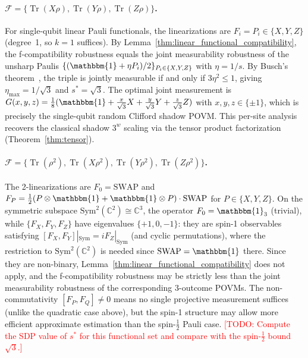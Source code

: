 \documentclass[aps,%
twocolumn,%
floatfix,%
pra,%
amsfonts,%
groupedaddress,%
superscriptaddress]{revtex4-2}%
\DeclareMathOperator{\tr}{Tr}
\newcommand{\ox}{\otimes}
\newcommand{\1}{\mathbbm{1}}
\begin{document}
\paragraph{$\mathcal{F} = \{\tr(X\rho), \tr(Y\rho), \tr(Z\rho)\}$.}
\color{red}
For single-qubit linear Pauli functionals, the linearizations are $F_i = P_i \in \{X,Y,Z\}$ (degree~1, so $k=1$ suffices). By Lemma~\ref{thm:linear_functional_compatibility}, the f-compatibility robustness equals the joint measurability robustness of the unsharp Paulis $\{(\1 + \eta P_i)/2\}_{P_i \in \{X,Y,Z\}}$ with $\eta = 1/s$. By Busch's theorem~\cite{Busch1986}, the triple is jointly measurable if and only if $3\eta^2 \leq 1$, giving $\eta_{\max} = 1/\sqrt{3}$ and $s^* = \sqrt{3}$. The optimal joint measurement is $G(x,y,z) = \frac{1}{8}(\1 + \frac{x}{\sqrt{3}} X + \frac{y}{\sqrt{3}} Y + \frac{z}{\sqrt{3}} Z)$ with $x,y,z \in \{\pm 1\}$, which is precisely the single-qubit random Clifford shadow POVM. This per-site analysis recovers the classical shadow $3^w$ scaling via the tensor product factorization (Theorem~\ref{thm:tensor}).
\color{black}

\paragraph{$\mathcal{F} = \{ \tr(\rho^2),\tr(X\rho^2), \tr(Y\rho^2), \tr(Z\rho^2)\}$.}
\color{red}
The 2-linearizations are $F_0 = \mathrm{SWAP}$ and $F_P = \frac{1}{2}(P\ox\1 + \1\ox P)\cdot\mathrm{SWAP}$ for $P \in \{X,Y,Z\}$. On the symmetric subspace $\mathrm{Sym}^2(\mathbb{C}^2) \cong \mathbb{C}^3$, the operator $F_0 = \1_3$ (trivial), while $\{F_X, F_Y, F_Z\}$ have eigenvalues $\{+1, 0, -1\}$: they are spin-1 observables satisfying $[F_X, F_Y]|_{\mathrm{Sym}} = iF_Z|_{\mathrm{Sym}}$ (and cyclic permutations), where the restriction to $\mathrm{Sym}^2(\mathbb{C}^2)$ is needed since $\mathrm{SWAP} = \1$ there. Since they are non-binary, Lemma~\ref{thm:linear_functional_compatibility} does not apply, and the f-compatibility robustness may be strictly less than the joint measurability robustness of the corresponding 3-outcome POVMs. The non-commutativity $[F_P, F_Q] \neq 0$ means no single projective measurement suffices (unlike the quadratic case above), but the spin-1 structure may allow more efficient approximate estimation than the spin-$\frac{1}{2}$ Pauli case. \textcolor{red}{[TODO: Compute the SDP value of $s^*$ for this functional set and compare with the spin-$\frac{1}{2}$ bound $\sqrt{3}$.]}
\color{black}
\end{document}
